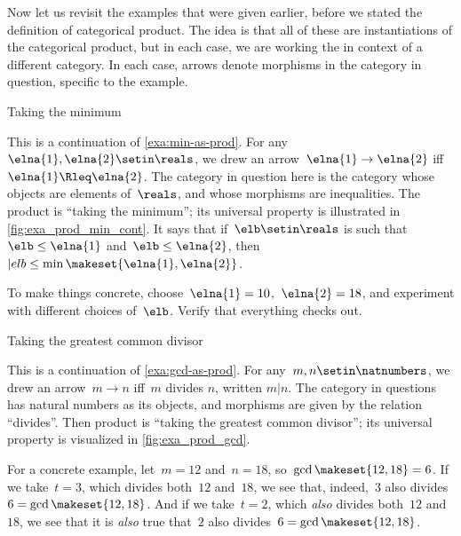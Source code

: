 Now let us revisit the examples that were given earlier, before we stated the definition of categorical product.
The idea is that all of these are instantiations of the categorical product, but in each case, we are working the in context of a different category.
In each case, arrows denote morphisms in the category in question, specific to the example.

\begin{marginfigure}
    \centering
    \caption{Taking the minimum}
    \label{fig:exa_prod_min_cont}
\end{marginfigure}

\begin{example}
    \label{exa:min-as-prod-cont}
    This is a continuation of \cref{exa:min-as-prod}.
    For any~$\elna{1},\elna{2}\setin \reals$, we drew an arrow~$\elna{1}\to \elna{2}$ iff~$\elna{1}\Rleq \elna{2}$.
    The category in question here is the category whose objects are elements of~$\reals$, and whose morphisms are inequalities.
    The product is ``taking the minimum'';
    its universal property is illustrated in \cref{fig:exa_prod_min_cont}.
    It says that if~$\elb \setin \reals$ is such that~$\elb \leq \elna{1}$ and~$\elb \leq \elna{2}$, then~$|elb \leq \min \makeset{ \elna{1}, \elna{2} }$.

    To make things concrete, choose~$\elna{1} = 10$,~$\elna{2} = 18$, and experiment with different choices of~$\elb$.
    Verify that everything checks out.
\end{example}

\begin{marginfigure}
    \centering
    \caption{Taking the greatest common divisor}
    \label{fig:exa_prod_gcd_cont}
\end{marginfigure}

\begin{example}
    \label{exa:gcd-as-prod-cont}
    This is a continuation of \cref{exa:gcd-as-prod}.
    For any~$m, n \setin \natnumbers$, we drew an arrow~$m \to n$ iff~$m$ divides $n$, written $m | n$.
    The category in questions has natural numbers as its objects, and morphisms are given by the relation ``divides''.
    Then product is ``taking the greatest common divisor''; its universal property is visualized in \cref{fig:exa_prod_gcd}.

    For a concrete example, let~$m = 12$ and~$n = 18$, so~$\gcd \makeset{12, 18 } = 6$.
    If we take~$t = 3$, which divides both~$12$ and~$18$, we see that, indeed,~$3$ also divides~$6 = \gcd \makeset{12, 18 }$.
    And if we take~$t = 2$, which \emph{also} divides both~$12$ and~$18$, we see that it is \emph{also} true that~$2$ also divides~$6 = \gcd \makeset{12, 18 }$.
\end{example}

